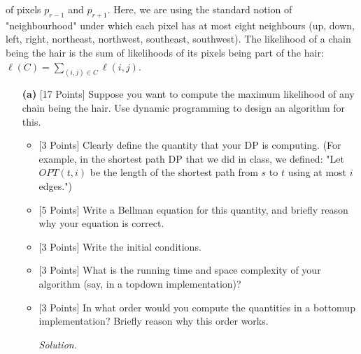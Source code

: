 \documentclass[10pt]{article}
\begin{document}
of pixels $p_{r-1}$ and $p_{r+1}$. Here, we are using the standard notion of "neighbourhood" under which each pixel has at most eight neighbours (up, down, left, right, northeast, northwest, southeast, southwest). The likelihood of a chain being the hair is the sum of likelihoods of its pixels being part of the hair: $\ell (C) = \sum_{(i, j) \in C} \ell(i, j)$.
\begin{enumerate}
    \item[\textbf{(a)}] {[17 Points]} Suppose you want to compute the maximum likelihood of any chain being the hair. Use dynamic programming to design an algorithm for this.
    \begin{itemize}
        \item {[3 Points]} Clearly define the quantity that your DP is computing. (For example, in the shortest path DP that we did in class, we defined: "Let $OPT(t, i)$ be the length of the shortest path from $s$ to $t$ using at most $i$ edges.")
        \item {[5 Points]} Write a Bellman equation for this quantity, and briefly reason why your equation is correct.
        \item {[3 Points]} Write the initial conditions.
        \item {[3 Points]} What is the running time and space complexity of your algorithm (say, in a top\-down implementation)?
        \item {[3 Points]} In what order would you compute the quantities in a bottom\-up implementation? Briefly reason why this order works.
        
        \begin{mdframed}
            \textit{Solution.}\\
            

\end{mdframed}
\end{itemize}
\end{enumerate}
\end{document}

